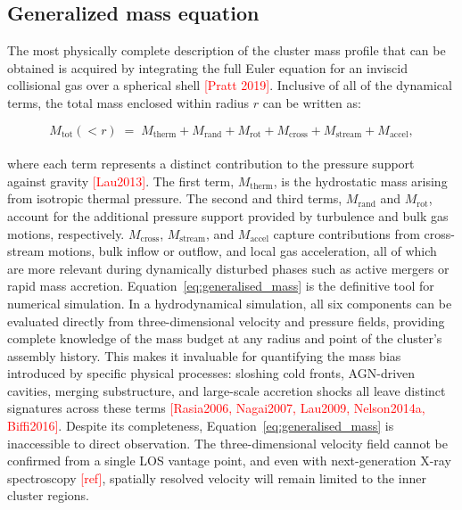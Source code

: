 \subsection{Generalized mass equation}
\label{sec:generalised_mass}

The most physically complete description of the cluster mass profile that can be obtained is acquired by integrating the full Euler equation for an inviscid collisional gas over a spherical shell \textcolor{red}{[Pratt 2019]}. Inclusive of all of the dynamical terms, the total mass enclosed within radius $r$ can be written as:

\begin{equation}
	M_{\mathrm{tot}}(<r) \;=\; M_{\mathrm{therm}} + M_{\mathrm{rand}} + M_{\mathrm{rot}}
	+ M_{\mathrm{cross}} + M_{\mathrm{stream}} + M_{\mathrm{accel}},
	\label{eq:generalised_mass}
\end{equation}
\\
where each term represents a distinct contribution to the pressure support against gravity \textcolor{red}{[Lau2013]}. The first term, $M_{\mathrm{therm}}$, is the hydrostatic mass arising from isotropic thermal pressure. The second and third terms, $M_{\mathrm{rand}}$ and $M_{\mathrm{rot}}$, account for the additional pressure support provided by turbulence and bulk gas motions, respectively. $M_{\mathrm{cross}}$, $M_{\mathrm{stream}}$, and $M_{\mathrm{accel}}$ capture contributions from cross-stream motions, bulk inflow or outflow, and local gas acceleration, all of which are more relevant during dynamically disturbed phases such as active mergers or rapid mass accretion.
\pbreak
Equation~\ref{eq:generalised_mass} is the definitive tool for numerical simulation. In a hydrodynamical simulation, all six components can be evaluated directly from three-dimensional velocity and pressure fields, providing complete knowledge of the mass budget at any radius and point of the cluster's assembly history. This makes it invaluable for quantifying the mass bias introduced by specific physical processes: sloshing cold fronts, AGN-driven cavities, merging substructure, and large-scale accretion shocks all leave distinct signatures across these terms \textcolor{red}{[Rasia2006, Nagai2007, Lau2009, Nelson2014a, Biffi2016]}. %
\pbreak 
Despite its completeness, Equation~\ref{eq:generalised_mass} is inaccessible to direct observation. The three-dimensional velocity field cannot be confirmed from a single LOS vantage point, and even with next-generation X-ray spectroscopy \textcolor{red}{[ref]}, spatially resolved velocity will remain limited to the inner cluster regions.

